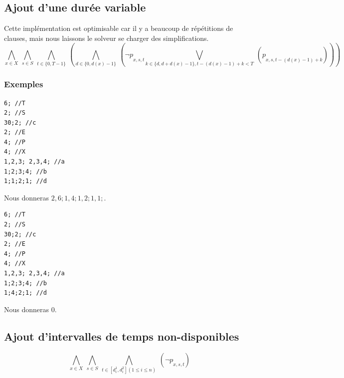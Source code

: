 \documentclass[a4paper,10pt]{article}
\begin{document}
\subsection{Ajout d'une durée variable}
Cette implémentation est optimisable car il y a beaucoup de répétitions de clauses, 
mais nous laissons le solveur se charger des simplifications.
\begin{equation}
\bigwedge\limits_{x \in X}\ \bigwedge\limits_{s \in S}\ \bigwedge\limits_{t \in \{0,T-1\}}\ ( \bigwedge\limits_{d \in \{0, d(x)-1\}}\ (\neg p\underset{x,s,t}{} \bigvee\limits_{k \in \{d, d+d(x)-1\}, t-(d(x)-1)+k < T}\  (p\underset{x,s,t-(d(x)-1)+k}{})))
\end{equation}

\subsubsection{Exemples}
\begin{lstlisting}[frame=single]
6; //T
2; //S
30;2; //c
2; //E
4; //P
4; //X
1,2,3; 2,3,4; //a
1;2;3;4; //b
1;1;2;1; //d
\end{lstlisting}
Nous donneras $2,6;1,4;1,2;1,1;$.
\begin{lstlisting}[frame=single]
6; //T
2; //S
30;2; //c
2; //E
4; //P
4; //X
1,2,3; 2,3,4; //a
1;2;3;4; //b
1;4;2;1; //d
\end{lstlisting}
Nous donneras $0$.


\subsection{Ajout d'intervalles de temps non-disponibles}
\begin{equation}
\bigwedge\limits_{x \in X}\ \bigwedge\limits_{s \in S}\ \bigwedge\limits_{t \in [d_i^1,d_i^2] (1 \le i \le n ) }\ (\neg p\underset{x,s,t}\ )
\end{equation}
\end{document}
